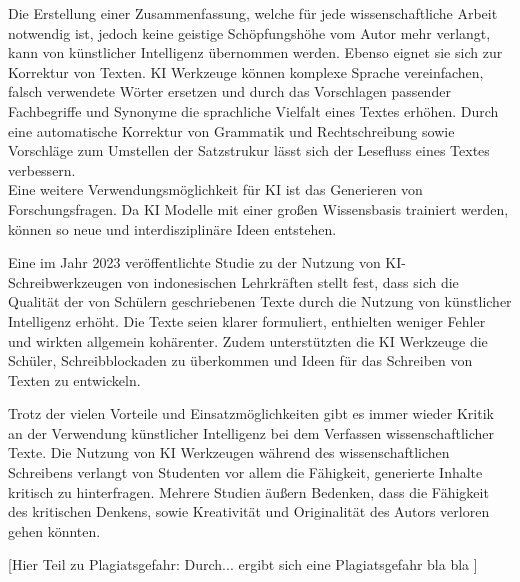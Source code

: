\documentclass[../main.tex]{subfiles}
\begin{document}
Die Erstellung einer Zusammenfassung, welche für jede wissenschaftliche Arbeit notwendig ist, jedoch keine geistige Schöpfungshöhe vom Autor mehr verlangt, 
kann von künstlicher Intelligenz übernommen werden. Ebenso eignet sie sich zur Korrektur von Texten. KI Werkzeuge können komplexe Sprache vereinfachen, falsch 
verwendete Wörter ersetzen und durch das Vorschlagen passender Fachbegriffe und Synonyme die sprachliche Vielfalt eines Textes erhöhen. Durch eine 
automatische Korrektur von Grammatik und Rechtschreibung sowie Vorschläge zum Umstellen der Satzstrukur lässt sich der Lesefluss eines Textes verbessern.\cite{ZukunftWissenschaftlichesPublizieren,teachers}\\
Eine weitere Verwendungsmöglichkeit für KI ist das Generieren von Forschungsfragen. Da KI Modelle mit einer großen Wissensbasis trainiert werden, 
können so neue und interdisziplinäre Ideen entstehen.\cite{ZukunftWissenschaftlichesPublizieren,humanWritingToAi}

Eine im Jahr 2023 veröffentlichte Studie zu der Nutzung von KI-Schreibwerkzeugen von indonesischen Lehrkräften stellt fest, dass sich die Qualität der von 
Schülern geschriebenen Texte durch die Nutzung von künstlicher Intelligenz erhöht. Die Texte seien klarer formuliert, enthielten weniger Fehler und 
wirkten allgemein kohärenter. Zudem unterstützten die KI Werkzeuge die Schüler, Schreibblockaden zu überkommen und Ideen für das Schreiben von Texten zu entwickeln.\cite{teachers} 

Trotz der vielen Vorteile und Einsatzmöglichkeiten gibt es immer wieder Kritik an der Verwendung künstlicher Intelligenz bei dem Verfassen wissenschaftlicher Texte. 
Die Nutzung von KI Werkzeugen während des wissenschaftlichen Schreibens verlangt von Studenten vor allem die Fähigkeit, generierte Inhalte kritisch zu 
hinterfragen. Mehrere Studien äußern Bedenken, dass die Fähigkeit des kritischen Denkens, sowie Kreativität und Originalität des Autors verloren gehen könnten.\cite{ZukunftWissenschaftlichesPublizieren,teachers,BucherSchwarzerHolzwweißig}

[Hier Teil zu Plagiatsgefahr: Durch... ergibt sich eine Plagiatsgefahr bla bla ]
\end{document}
